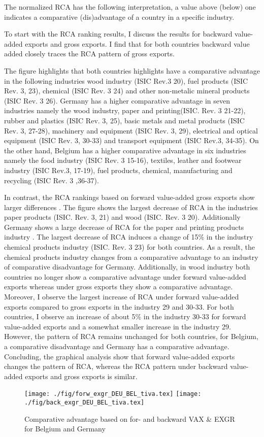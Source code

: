 The normalized RCA has the following interpretation, a value above (below) one indicates a comparative (dis)advantage of a country in a specific industry.
 \par
 To start with the RCA ranking results, I discuss the results for backward value-added exports and gross exports.
 I find that for both countries backward value added closely traces the RCA pattern of gross exports.
\par
 The figure highlights that both countries highlights have a comparative advantage in the following industries wood industry (ISIC Rev.3 20), fuel products (ISIC Rev. 3, 23), chemical (ISIC Rev. 3 24) and other non-metalic mineral products (ISIC Rev. 3 26).
 Germany has a higher comparative advantage in seven industries namely the wood industry, paper and printing(ISIC. Rev. 3 21-22), rubber and plastics (ISIC Rev. 3, 25), basic metals and metal products (ISIC Rev. 3, 27-28), machinery and equipment (ISIC Rev. 3, 29), electrical and optical equipment (ISIC Rev. 3, 30-33) and transport equipment (ISIC Rev.3, 34-35).
 On the other hand, Belgium has a higher comparative advantage in six industries namely the food industry (ISIC Rev. 3 15-16), textiles, leather and footwear industry (ISIC Rev.3, 17-19), fuel products, chemical, manufacturing and recycling (ISIC Rev. 3 ,36-37).
  \par
 In contrast, the RCA rankings based on forward value-added gross exports show larger differences .
 The figure shows the largest decrease of RCA in the industries paper products (ISIC. Rev. 3, 21) and wood (ISIC. Rev. 3 20).
 Additionally Germany shows a large decrease of RCA for the paper and printing products industry .
 The largest decrease of RCA induces a change of 15\%  in the industry chemical products industry (ISIC. Rev. 3 23) for both countries.
 As a result, the  chemical products industry  changes from a comparative advantage to an industry of comparative disadvantage for Germany.
 Additionally, in wood industry both countries  no longer show a comparative advantage under forward  value-added exports whereas under gross exports they show a comparative advantage.
 Moreover, I observe the largest increase of RCA under forward value-added exports compared to gross exports in the industry 29 and 30-33.
 For both countries, I observe an increase of about 5\% in the industry 30-33 for forward value-added exports and a somewhat smaller increase in the industry 29.
 However, the pattern of RCA remains unchanged for both countries, for Belgium, a comparative disadvantage and Germany has a comparative advantage.
 Concluding, the graphical analysis show that forward value-added exports changes the pattern of RCA, whereas the RCA pattern under backward value-added exports and gross exports is similar.
 \begin{figure}
\caption{Comparative advantage based on for- and backward  VAX \& EXGR for Belgium and Germany}
\texttt{[image: ./fig/forw\_exgr\_DEU\_BEL\_tiva.tex]}
\texttt{[image: ./fig/back\_exgr\_DEU\_BEL\_tiva.tex]}
\end{figure}
\endinput

